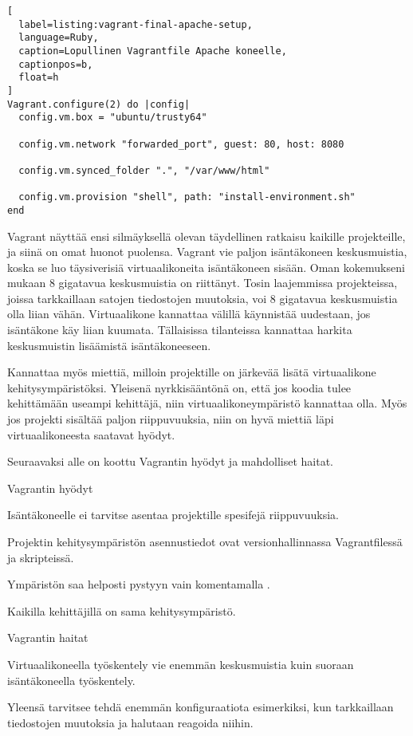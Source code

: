 \begin{lstlisting}[
  label=listing:vagrant-final-apache-setup,
  language=Ruby,
  caption=Lopullinen Vagrantfile Apache koneelle,
  captionpos=b,
  float=h
]
Vagrant.configure(2) do |config|
  config.vm.box = "ubuntu/trusty64"

  config.vm.network "forwarded_port", guest: 80, host: 8080

  config.vm.synced_folder ".", "/var/www/html"

  config.vm.provision "shell", path: "install-environment.sh"
end
\end{lstlisting}


Vagrant näyttää ensi silmäyksellä olevan täydellinen ratkaisu kaikille projekteille, ja siinä on omat huonot puolensa. Vagrant vie paljon isäntäkoneen keskusmuistia, koska se luo täysiverisiä virtuaalikoneita isäntäkoneen sisään. Oman kokemukseni mukaan 8 gigatavua keskusmuistia on riittänyt. Tosin laajemmissa projekteissa, joissa tarkkaillaan satojen tiedostojen muutoksia, voi 8 gigatavua keskusmuistia olla liian vähän. Virtuaalikone kannattaa välillä käynnistää uudestaan, jos isäntäkone käy liian kuumata. Tällaisissa tilanteissa kannattaa harkita keskusmuistin lisäämistä isäntäkoneeseen.

Kannattaa myös miettiä, milloin projektille on järkevää lisätä virtuaalikone kehitysympäristöksi. Yleisenä nyrkkisääntönä on, että jos koodia tulee kehittämään useampi kehittäjä, niin virtuaalikoneympäristö kannattaa olla. Myös jos projekti sisältää paljon riippuvuuksia, niin on hyvä miettiä läpi virtuaalikoneesta saatavat hyödyt.

Seuraavaksi alle on koottu Vagrantin hyödyt ja mahdolliset haitat.

Vagrantin hyödyt
\begin{bullet-list}
  \item Isäntäkoneelle ei tarvitse asentaa projektille spesifejä riippuvuuksia.
  \item Projektin kehitysympäristön asennustiedot ovat versionhallinnassa Vagrantfilessä ja skripteissä.
  \item Ympäristön saa helposti pystyyn vain komentamalla .
  \item Kaikilla kehittäjillä on sama kehitysympäristö.
\end{bullet-list}

Vagrantin haitat
\begin{bullet-list}
  \item Virtuaalikoneella työskentely vie enemmän keskusmuistia kuin suoraan isäntäkoneella työskentely.
  \item Yleensä tarvitsee tehdä enemmän konfiguraatiota esimerkiksi, kun tarkkaillaan tiedostojen muutoksia ja halutaan reagoida niihin.
\end{bullet-list}

